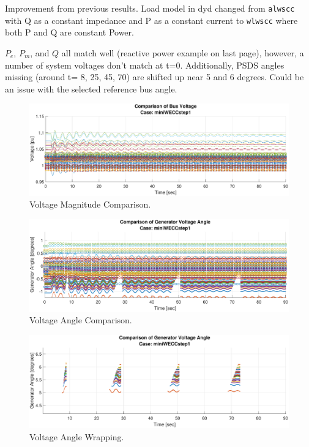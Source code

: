\documentclass[12pt]{article}
\begin{document}
Improvement from previous results. Load model in dyd changed from \verb|alwscc| with Q as a constant impedance and P as a constant current to \verb|wlwscc| where both P and Q are constant Power.\\
\pagebreak

$P_e$, $P_m$, and $Q$ all match well (reactive power example on last page), however, a number of system voltages don't match at t=0. Additionally, PSDS angles missing (around t= 8, 25, 45, 70) are shifted up near 5 and 6 degrees. Could be an issue with the selected reference bus angle.

	\begin{figure}[h!]
			\centering
			\includegraphics[width=\linewidth]{miniWECCstep1V}\vspace{-1em}
			\caption{Voltage Magnitude Comparison.}
			\label{vMag}		 
	\end{figure}\vspace{-2em}
	\begin{figure}[h!]
				\centering
				\includegraphics[width=\linewidth]{miniWECCstep1Angle}  \vspace{-2em}
				\caption{Voltage Angle Comparison.} 
				\label{vAng}
	\end{figure}\vspace{-2em}
	\begin{figure}[h!]
				\centering
				\includegraphics[width=\linewidth]{miniWECCstep1MissingAngle}  \vspace{-2em}
				\caption{Voltage Angle Wrapping.} 
				\label{vAng}
	\end{figure}\vspace{-2em}
\pagebreak
\end{document}
